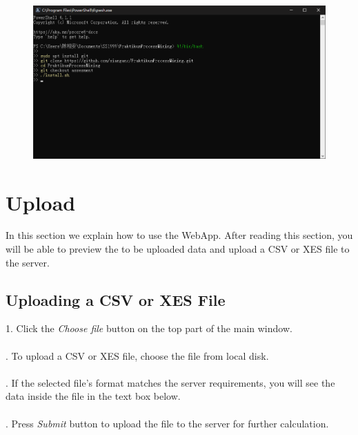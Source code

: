 \documentclass[runningheads]{llncs}
\begin{document}
\begin{figure}[h]	
	\centering
	\includegraphics[scale=0.3]{setup.png}
	\caption{}
	\label{fig:label}
\end{figure}

\section{Upload}

In this section we explain how to use the WebApp. After reading this section, you will be able to preview the to be uploaded data and upload a CSV or XES file to the server.

\subsection{Uploading a CSV or XES File}

1. Click the \textit{Choose file} button on the top part of the main window.\\\\
. To upload a CSV or XES file, choose the file from local disk.\\\\
. If the selected file's format matches the server requirements, you will see the data inside the file in the text box below.\\\\
. Press \textit{Submit} button to upload the file to the server for further calculation.
\end{document}
